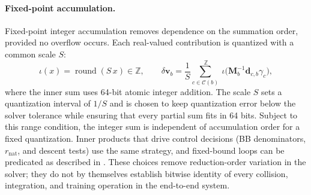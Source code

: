 \documentclass{article}
\newcommand{\M}{\mathbf{M}}
\newcommand{\vv}{\mathbf{v}}
\theoremstyle{plain}
\theoremstyle{definition}
\begin{document}
\paragraph{Fixed-point accumulation.}
Fixed-point integer accumulation removes dependence on the summation order,
provided no overflow occurs. Each real-valued contribution is quantized with a
common scale $S$:
\begin{equation}
\iota(x)=\operatorname{round}(S\,x)\in\mathbb Z,
\qquad
\delta\vv_b=\frac1S\sum_{c\in\mathcal C(b)}^{\ \mathbb Z}\ \iota\bigl(\M_b^{-1}\mathbf d_{c,b}\gamma_c\bigr),
\end{equation}
where the inner sum uses 64-bit atomic integer addition. The scale $S$ sets a
quantization interval of $1/S$ and is chosen to keep quantization error below
the solver tolerance while ensuring that every partial sum fits in 64 bits.
Subject to this range condition, the integer sum is independent of accumulation
order for a fixed quantization. Inner products that
drive control decisions (BB denominators, $r_{\mathrm{nat}}$, and descent tests)
use the same strategy, and fixed-bound loops can be predicated as described in
. These choices remove reduction-order variation in the solver;
they do not by themselves establish bitwise identity of every collision,
integration, and training operation in the end-to-end system.



\end{document}
